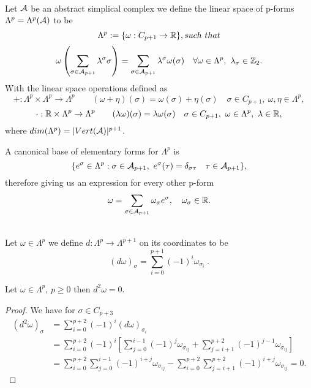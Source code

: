 \documentclass[../1.tex]{subfiles}
\begin{document}
    \begin{defn}
        \\
        Let $\mathcal{A}$ be an abstract simplical complex we define the linear space of p-forms $\Lambda^p = \Lambda^p(\mathcal{A})$ to be 
        \[ \Lambda^p := \{ \omega : C_{p+1} \to \R\}, such \ that\]
        \[ \omega \left( \sum_{\sigma \in \mathcal{A}_{p+1}} \lambda^\sigma \sigma \right) = \sum_{\sigma \in \mathcal{A}_{p+1}} \lambda^\sigma \omega(\sigma)
        \quad \forall \omega \in \Lambda^p , \ \lambda_\sigma \in \mathbb{Z}_2.\]
        With the linear space operations defined as
        \[ + : \Lambda^p \times \Lambda^p \to \Lambda^p \quad
        \quad (\omega + \eta)(\sigma) = \omega(\sigma) + \eta(\sigma) \quad \sigma \in C_{p+1},\ \omega,\eta \in \Lambda^p, \]
        \[ \cdot : \mathbb{R} \times \Lambda^p \to \Lambda^p \quad
        \quad (\lambda \omega)(\sigma) = \lambda \omega(\sigma) \quad \sigma \in C_{p+1},\ \omega \in \Lambda^p,\ \lambda \in \mathbb{R}, \]
        where $dim(\Lambda^p) = |Vert(\mathcal{A})|^{p+1}$.
    \end{defn} 
    \begin{prop}
        A canonical base of elementary forms for $\Lambda^p$ is
        \[ \{e^\sigma \in \Lambda^p : \sigma \in \mathcal{A}_{p+1},\ e^\sigma(\tau) = \delta_{\sigma \tau} \quad \tau \in \mathcal{A}_{p+1}\},\]
        therefore giving us an expression for every other p-form
        \[ \omega = \sum_{\sigma \in \mathcal{A}_{p+1}} \omega_\sigma e^\sigma, \quad \omega_\sigma \in \mathbb{R}. \]
    \end{prop}
    \begin{defn}
        \\
        Let $\omega \in \Lambda^p$ we define $d : \Lambda^p \to \Lambda^{p+1}$ on its coordinates to be 
        \[ (d \omega)_\sigma = \sum_{i = 0}^{p+1} (-1)^i \omega_{\sigma_i} \ . \]
    \end{defn}
    \begin{lem}
        Let $\omega \in \Lambda^p$, $p \geq 0$ then $d^2 \omega = 0$.
    \end{lem}
    \begin{proof}
        We have for $\sigma \in C_{p+3}$\\
        \begin{equation*}
            \begin{aligned}
                (d^2 \omega)_\sigma &= \sum_{i = 0}^{p+2} (-1)^i (d \omega)_{\sigma_i} \\
                &= \sum_{i = 0}^{p+2} (-1)^i \left[ \sum_{j = 0}^{i-1}(-1)^j \omega_{\sigma_{ij}} + 
                \sum_{j = i+1}^{p+2} (-1)^{j-1} \omega_{\sigma_{ij}} \right]\\
                &= \sum_{i = 0}^{p+2} \sum_{j = 0}^{i-1} (-1)^{i+j} \omega_{\sigma_{ij}} -
                \sum_{i = 0}^{p+2} \sum_{j = i+1}^{p+2} (-1)^{i+j} \omega_{\sigma_{ij}} = 0.
            \end{aligned}
        \end{equation*}
    \end{proof}
\end{document}
